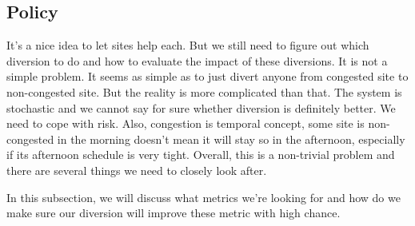 \subsection{Policy}

It's a nice idea to let sites help each. But we still need to figure out which diversion to do and how to evaluate the impact of these diversions. It is not a simple problem. It seems as simple as to just divert anyone from congested site to non-congested site. But the reality is more complicated than that. The system is stochastic and we cannot say for sure whether diversion is definitely better. We need to cope with risk. Also, congestion is temporal concept, some site is non-congested in the morning doesn't mean it will stay so in the afternoon, especially if its afternoon schedule is very tight.  Overall, this is a non-trivial problem and there are several things
we need to closely look after.

In this subsection, we will discuss what metrics we're looking for and how do we make sure our diversion will improve these metric with high chance.





